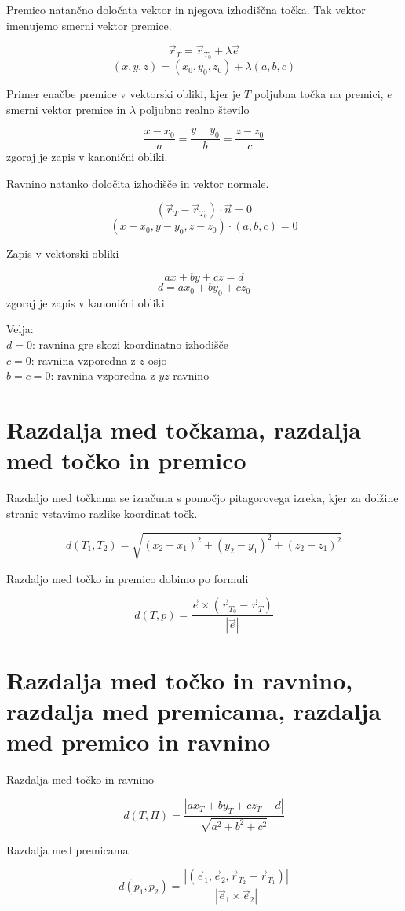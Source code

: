 \documentclass[12pt]{report}
\begin{document}
Premico natančno določata vektor in njegova izhodiščna točka. Tak vektor imenujemo smerni vektor premice.

\[\vec{r}_T = \vec{r}_{T_0} + \lambda\vec{e}\]
\[(x,y,z) = (x_0,y_0,z_0)+\lambda (a,b,c)\]

Primer enačbe premice v vektorski obliki, kjer je $T$ poljubna točka na premici, $e$ smerni vektor premice in $\lambda$ poljubno realno število

\[\frac{x-x_0}{a} = \frac{y-y_0}{b} = \frac{z-z_0}{c}
\]
zgoraj je zapis v kanonični obliki.


Ravnino natanko določita izhodišče in vektor normale.

\[(\vec{r}_T - \vec{r}_{T_0}) \cdot \vec{n} = 0 
 \]
\[
(x - x_0, y - y_0, z - z_0) \cdot (a, b, c) = 0 \]

Zapis v vektorski obliki

\[
ax + by + cz = d
\]
\[
d = ax_0 + by_0 + cz_0
\]
zgoraj je zapis v kanonični obliki.

Velja:\\
$d=0$: ravnina gre skozi koordinatno izhodišče\\
$c=0$: ravnina vzporedna z $z$ osjo\\
$b=c=0$: ravnina vzporedna z $yz$ ravnino


\pagebreak
\section*{Razdalja med točkama, razdalja med točko in premico}
Razdaljo med točkama se izračuna s pomočjo pitagorovega izreka, kjer za dolžine stranic vstavimo razlike koordinat točk.

\[d(T_1, T_2) = \sqrt{(x_2 - x_1)^2 + (y_2 - y_1)^2 + (z_2 - z_1)^2}\]

Razdaljo med točko in premico dobimo po formuli

\[d(T, p) = \frac{\vec{e} \times (\vec{r}_{T_0} - \vec{r}_T)}{|\vec{e}|}\]

\section*{Razdalja med točko in ravnino, razdalja med premicama, razdalja med premico in ravnino}
Razdalja med točko in ravnino

\[d(T, \Pi) = \frac{|ax_T + by_T + cz_T - d|}{\sqrt{a^2 + b^2 + c^2}}\]

Razdalja med premicama 

\[d(p_1, p_2) = \frac{|(\vec e_1, \vec e_2, \vec r_{T_2}-\vec r_{T_1})|}{|\vec e_1 \times \vec e_2|}\]
\end{document}
